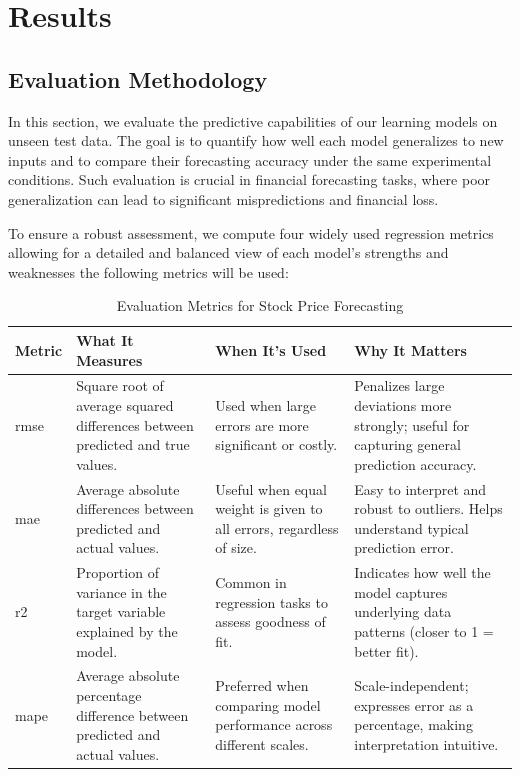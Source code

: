 \clearpage
\section{Results}

\subsection{Evaluation Methodology}

In this section, we evaluate the predictive capabilities of our learning models 
on unseen test data. The goal is to quantify how well each model generalizes to new inputs
and to compare their forecasting accuracy under the same experimental conditions. 
Such evaluation is crucial in financial forecasting tasks, where poor generalization 
can lead to significant mispredictions and financial loss.

To ensure a robust assessment, we compute four widely used regression metrics 
allowing for a detailed and balanced view of each model’s strengths and weaknesses the
following metrics will be used:

\begin{table}[H]
\centering
\caption{Evaluation Metrics for Stock Price Forecasting}
\label{tab:evaluation-metrics-usage}
\begin{tabular}{lp{3.5cm}p{3.5cm}p{4.5cm}}
\hline
\textbf{Metric} & \textbf{What It Measures} & \textbf{When It's Used} & \textbf{Why It Matters} \\
\hline\hline
\acrshort{rmse} &
  Square root of average squared differences between predicted and true values. &
  Used when large errors are more significant or costly. &
  Penalizes large deviations more strongly; useful for capturing general prediction accuracy. \\
\acrshort{mae} &
  Average absolute differences between predicted and actual values. &
  Useful when equal weight is given to all errors, regardless of size. &
  Easy to interpret and robust to outliers. Helps understand typical prediction error. \\
\acrshort{r2} &
  Proportion of variance in the target variable explained by the model. &
  Common in regression tasks to assess goodness of fit. &
  Indicates how well the model captures underlying data patterns (closer to 1 = better fit). \\
 \acrshort{mape} &
  Average absolute percentage difference between predicted and actual values. &
  Preferred when comparing model performance across different scales. &
  Scale-independent; expresses error as a percentage, making interpretation intuitive. \\
\hline
\end{tabular}
\end{table}

